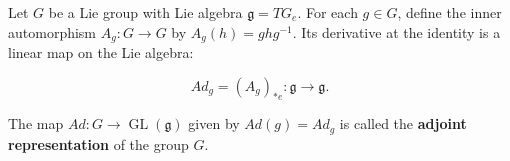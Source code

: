 Let $G$ be a Lie group with Lie algebra $\mathfrak{g} = TG_e$. For each $g \in G$, define the inner automorphism $A_g: G \to G$ by $A_g(h) = ghg^{-1}$. Its derivative at the identity is a linear map on the Lie algebra:

$$Ad_g = (A_g)_{*e} : \mathfrak{g} \to \mathfrak{g}.$$

The map $Ad: G \to \operatorname{GL}(\mathfrak{g})$ given by $Ad(g) = Ad_g$ is called the \textbf{adjoint representation} of the group $G$.
